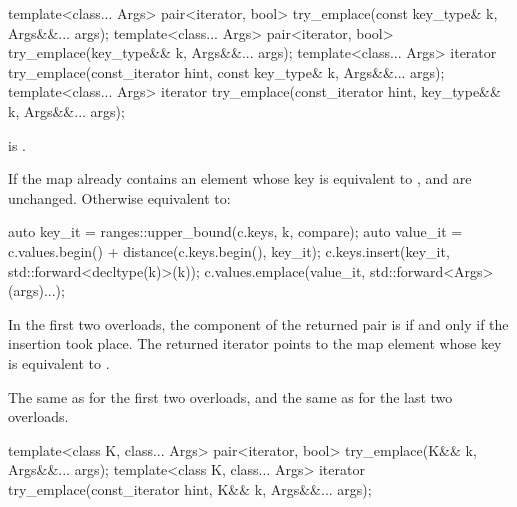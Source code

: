 %
\begin{itemdecl}
template<class... Args>
  pair<iterator, bool> try_emplace(const key_type& k, Args&&... args);
template<class... Args>
  pair<iterator, bool> try_emplace(key_type&& k, Args&&... args);
template<class... Args>
  iterator try_emplace(const_iterator hint, const key_type& k, Args&&... args);
template<class... Args>
  iterator try_emplace(const_iterator hint, key_type&& k, Args&&... args);
\end{itemdecl}

\begin{itemdescr}
\pnum
\constraints
{} is .

\pnum
\effects
If the map already contains an element whose key is equivalent to ,
 and  are unchanged.
Otherwise equivalent to:
\begin{codeblock}
auto key_it = ranges::upper_bound(c.keys, k, compare);
auto value_it = c.values.begin() + distance(c.keys.begin(), key_it);
c.keys.insert(key_it, std::forward<decltype(k)>(k));
c.values.emplace(value_it, std::forward<Args>(args)...);
\end{codeblock}

\pnum
\returns
In the first two overloads,
the  component of the returned pair is 
if and only if the insertion took place.
The returned iterator points to the map element
whose key is equivalent to .

\pnum
\complexity
The same as  for the first two overloads, and
the same as  for the last two overloads.
\end{itemdescr}

%
\begin{itemdecl}
template<class K, class... Args>
  pair<iterator, bool> try_emplace(K&& k, Args&&... args);
template<class K, class... Args>
  iterator try_emplace(const_iterator hint, K&& k, Args&&... args);
\end{itemdecl}

